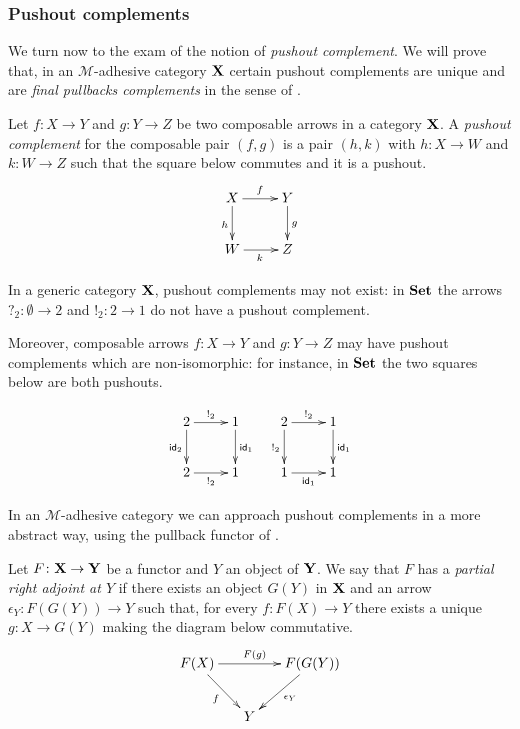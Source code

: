 \subsubsection{Pushout complements}

We turn now to the exam of the notion of \emph{pushout complement}. We will prove that, in an $\mathcal{M}$-adhesive category $\textbf {\textup{X}}$ certain pushout complements are unique and are \emph{final pullbacks complements} in the sense of \cite{dyckhoff1987exponentiable,corradini2006sesqui}.

\begin{definition}
Let $f\colon X\to Y$ and $g\colon Y\to Z$ be two composable arrows in a category $\textbf {\textup{X}}$. A \emph{pushout complement} for the composable pair $(f,g)$ is a pair $(h,k)$ with $h\colon X\to W$ and $k\colon W\to Z$ such that the square below commutes and it is a pushout.
\[\xymatrix{X \ar[r]^{f} \ar[d]_{h}& Y \ar[d]^{g} \\ W \ar[r]_{k}& Z}\]
\end{definition}

\begin{example}
	In a generic category $\textbf {\textup{X}}$, pushout complements may not exist: in $\textbf {\textup{Set}}$ the arrows $?_{2}\colon \emptyset \to 2$ and $!_2\colon 2\to 1$ do not have a pushout complement.
	
	Moreover, composable arrows $f\colon X\to Y$ and $g\colon Y\to Z$ may have  pushout complements which are non-isomorphic: for instance, in $\textbf {\textup{Set}}$ the two squares below are both pushouts.
	
	\[\xymatrix{2 \ar[r]^{!_2} \ar[d]_{\id{2}}& 1 \ar[d]^{\id{1}} & 2 \ar[r]^{!_2} \ar[d]_{!_2}& 1 \ar[d]^{\id{1}}\\ 2 \ar[r]_{!_2}& 1 & 1 \ar[r]_{\id{1}}& 1}\]
\end{example}


In an $\mathcal{M}$-adhesive category we can approach pushout complements in a more abstract way, using the pullback functor of .

\begin{definition}
Let $F\colon \textbf {\textup{X}} \to \textbf {\textup{Y}}$ be a functor and $Y$ an object of $\textbf {\textup{Y}}$. We say that $F$ has a \emph{partial right adjoint at $Y$} if there exists an object $G(Y)$ in $\textbf {\textup{X}}$ and an arrow $\epsilon_Y\colon F(G(Y))\to Y$ such that, for every  $f\colon F(X)\to Y$ there exists a unique $g\colon X\to G(Y)$ making the diagram below commutative.
\[\xymatrix@C=15pt{F(X) \ar[rr]^{F(g)} \ar[dr]_{f}&&F(G(Y)) \ar[dl]^{\epsilon_Y}\\ & Y}\]
\end{definition} 

